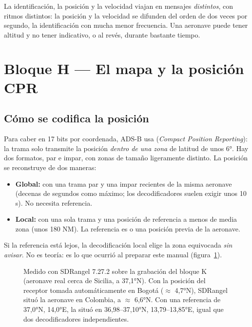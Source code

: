 \begin{nota}
La identificación, la posición y la velocidad viajan en mensajes \emph{distintos}, con ritmos distintos: la posición y la velocidad se difunden del orden de dos veces por segundo, la identificación con mucha menor frecuencia. Una aeronave puede tener altitud y no tener indicativo, o al revés, durante bastante tiempo.
\end{nota}

\section{Bloque H --- El mapa y la posición CPR}
\label{sec:u-mapa}

\subsection{Cómo se codifica la posición}

Para caber en 17 bits por coordenada, ADS-B usa  (\emph{Compact Position Reporting}): la trama solo transmite la posición \emph{dentro de una zona} de latitud de unos 6°. Hay dos formatos, par e impar, con zonas de tamaño ligeramente distinto. La posición se reconstruye de dos maneras:
\begin{itemize}
  \item \textbf{Global:} con una trama par y una impar recientes de la misma aeronave (decenas de segundos como máximo; los decodificadores suelen exigir unos 10 s). No necesita referencia.
  \item \textbf{Local:} con una sola trama y una posición de referencia a menos de media zona (unos 180 NM). La referencia es  o una posición previa de la aeronave.
\end{itemize}
Si la referencia está lejos, la decodificación local elige la zona equivocada \emph{sin avisar}. No es teoría: es lo que ocurrió al preparar este manual (figura~\ref{fig:cpr}).

\begin{figure}[H]
\centering
\resizebox{\linewidth}{!}{}
\caption{Medido con SDRangel 7.27.2 sobre la grabación del bloque K (aeronave real cerca de Sicilia, a 37,1°N). Con la posición del receptor tomada automáticamente en Bogotá ($\approx$ 4,7°N), SDRangel situó la aeronave en Colombia, a $\approx$ 6,6°N. Con una referencia de 37,0°N, 14,0°E, la situó en 36,98--37,10°N, 13,79--13,85°E, igual que dos decodificadores independientes.}
\label{fig:cpr}
\end{figure}

